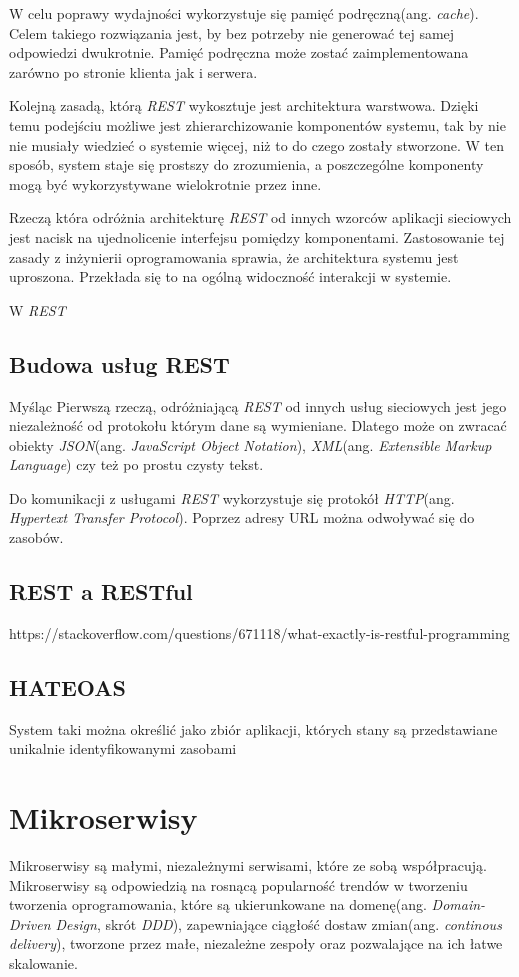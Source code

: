 W celu poprawy wydajności wykorzystuje się pamięć podręczną(ang. \textsl{cache}). Celem takiego rozwiązania jest, by bez potrzeby nie generować tej samej odpowiedzi dwukrotnie. Pamięć podręczna może zostać zaimplementowana zarówno po stronie klienta jak i serwera.

Kolejną zasadą, którą \textsl{REST} wykosztuje jest architektura warstwowa. Dzięki temu podejściu możliwe jest zhierarchizowanie komponentów systemu, tak by nie nie musiały wiedzieć o systemie więcej, niż to do czego zostały stworzone. W ten sposób, system staje się prostszy do zrozumienia, a poszczególne komponenty mogą być wykorzystywane wielokrotnie przez inne.

Rzeczą która odróżnia architekturę \textsl{REST} od innych wzorców aplikacji sieciowych jest nacisk na ujednolicenie interfejsu pomiędzy komponentami. Zastosowanie tej zasady z inżynierii oprogramowania sprawia, że architektura systemu jest uproszona. Przekłada się to na ogólną widoczność interakcji w systemie. 

W \textsl{REST} 

\subsection{Budowa usług REST}
Myśląc
Pierwszą rzeczą, odróżniającą \textsl{REST} od innych usług sieciowych jest jego niezależność od protokołu którym dane są wymieniane. Dlatego może on zwracać obiekty \textsl{JSON}(ang. \textsl{JavaScript Object Notation}), \textsl{XML}(ang. \textsl{Extensible Markup Language}) czy też po prostu czysty tekst. 

Do komunikacji z usługami \textsl{REST} wykorzystuje się protokół \textsl{HTTP}(ang. \textsl{Hypertext Transfer Protocol}). Poprzez adresy URL można odwoływać się do zasobów.

\subsection{REST a RESTful}
https://stackoverflow.com/questions/671118/what-exactly-is-restful-programming
\subsection{HATEOAS}
System taki można określić jako zbiór aplikacji, których stany są przedstawiane unikalnie identyfikowanymi zasobami
\section{Mikroserwisy}
Mikroserwisy są małymi, niezależnymi serwisami, które ze sobą współpracują\cite{newman}. Mikroserwisy są odpowiedzią na rosnącą popularność trendów w tworzeniu tworzenia oprogramowania, które są ukierunkowane na domenę(ang. \textsl{Domain-Driven Design}, skrót \textsl{DDD}), zapewniające ciągłość dostaw zmian(ang. \textsl{continous delivery}), tworzone przez małe, niezależne zespoły oraz pozwalające na ich łatwe skalowanie. 

